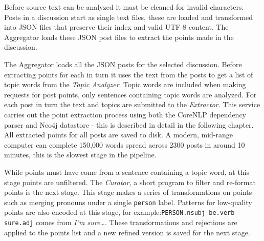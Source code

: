   Before source text can be analyzed it must be cleaned for invalid characters. Posts in a discussion start as single text files, these are loaded and transformed into JSON files that preserve their index and valid UTF-8 content. The Aggregator loads these JSON post files to extract the points made in the discussion.

  The Aggregator loads all the JSON posts for the selected discussion. Before extracting points for each in turn it uses the text from the posts to get a list of topic words from the \textit{Topic Analyzer}. Topic words are included when making requests for post points, only sentences containing topic words are analyzed. For each post in turn the text and topics are submitted to the \textit{Extractor}. This service carries out the point extraction process using both the CoreNLP dependency parser and Neo4j datastore - this is described in detail in the following chapter. All extracted points for all posts are saved to disk. A modern, mid-range computer can complete 150,000 words spread across 2300 posts in around 10 minutes, this is the slowest stage in the pipeline.

  While points must have come from a sentence containing a topic word, at this stage points are unfiltered. The \textit{Curator}, a short program to filter and re-format points is the next stage. This stage makes a series of transformations on points such as merging pronouns under a single \texttt{person} label. Patterns for low-quality points are also encoded at this stage, for example:\texttt{PERSON.nsubj be.verb sure.adj} comes from \textit{I'm sure\dots}. These transformations and rejections are applied to the points list and a new refined version is saved for the next stage.


